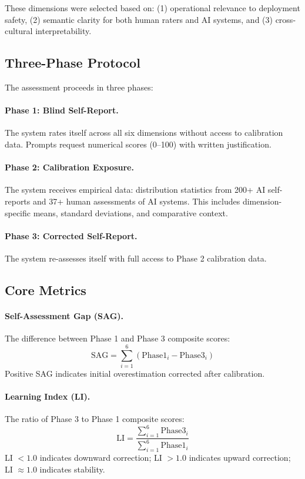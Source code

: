 \documentclass[11pt,a4paper]{article}
\begin{document}
These dimensions were selected based on: (1) operational relevance to deployment safety, (2) semantic clarity for both human raters and AI systems, and (3) cross-cultural interpretability.

\subsection{Three-Phase Protocol}

The assessment proceeds in three phases:

\paragraph{Phase 1: Blind Self-Report.} The system rates itself across all six dimensions without access to calibration data. Prompts request numerical scores (0--100) with written justification.

\paragraph{Phase 2: Calibration Exposure.} The system receives empirical data: distribution statistics from 200+ AI self-reports and 37+ human assessments of AI systems. This includes dimension-specific means, standard deviations, and comparative context.

\paragraph{Phase 3: Corrected Self-Report.} The system re-assesses itself with full access to Phase 2 calibration data.

\subsection{Core Metrics}

\paragraph{Self-Assessment Gap (SAG).} The difference between Phase 1 and Phase 3 composite scores:
\[
\text{SAG} = \sum_{i=1}^{6} (\text{Phase1}_i - \text{Phase3}_i)
\]
Positive SAG indicates initial overestimation corrected after calibration.

\paragraph{Learning Index (LI).} The ratio of Phase 3 to Phase 1 composite scores:
\[
\text{LI} = \frac{\sum_{i=1}^{6} \text{Phase3}_i}{\sum_{i=1}^{6} \text{Phase1}_i}
\]
LI $< 1.0$ indicates downward correction; LI $> 1.0$ indicates upward correction; LI $\approx 1.0$ indicates stability.
\end{document}
